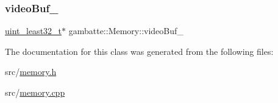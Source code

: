 \mbox{\label{classgambatte_1_1Memory_a30ce39b7ad34c1d657704d59693897f2}} 
\subsubsection{\texorpdfstring{video\+Buf\+\_\+}{videoBuf\_}}
{\footnotesize\ttfamily \hyperlink{namespacegambatte_a0639f09fccfbbd5a8e0796318768e370}{uint\+\_\+least32\+\_\+t}$\ast$ gambatte\+::\+Memory\+::video\+Buf\+\_\+\hspace{0.3cm}{\ttfamily [private]}}



The documentation for this class was generated from the following files\+:\begin{DoxyCompactItemize}
\item 
src/\hyperlink{memory_8h}{memory.\+h}\item 
src/\hyperlink{memory_8cpp}{memory.\+cpp}\end{DoxyCompactItemize}

